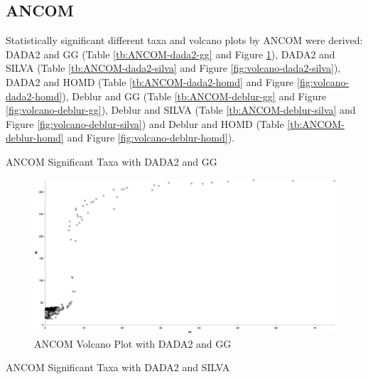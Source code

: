 \documentclass[a4paper]{article}
\begin{document}
        \subsection{ANCOM}
            Statistically significant different taxa and volcano plots by ANCOM were derived: DADA2 and GG (Table \ref{tb:ANCOM-dada2-gg} and Figure \ref{fig:volcano-dada2-gg}), DADA2 and SILVA (Table \ref{tb:ANCOM-dada2-silva} and Figure \ref{fig:volcano-dada2-silva}), DADA2 and HOMD (Table \ref{tb:ANCOM-dada2-homd} and Figure \ref{fig:volcano-dada2-homd}), Deblur and GG (Table \ref{tb:ANCOM-deblur-gg} and Figure \ref{fig:volcano-deblur-gg}), Deblur and SILVA (Table \ref{tb:ANCOM-deblur-silva} and Figure \ref{fig:volcano-deblur-silva}) and Deblur and HOMD (Table \ref{tb:ANCOM-deblur-homd} and Figure \ref{fig:volcano-deblur-homd}).

            \begin{table}[p]
                \centering
                \caption{ANCOM Significant Taxa with DADA2 and GG}
                \label{tb:ANCOM-dada2-gg}

            \end{table}

            \begin{figure}[p]
                \centering
                \includegraphics[width=0.8 \linewidth]{figures/ANCOM/DADA2.gg.png}
                \caption{ANCOM Volcano Plot with DADA2 and GG}
                \label{fig:volcano-dada2-gg}
            \end{figure}

            \begin{table}[p]
                \centering
                \caption{ANCOM Significant Taxa with DADA2 and SILVA}
                \label{tb:ANCOM-dada2-silva}

            \end{table}
\end{document}
